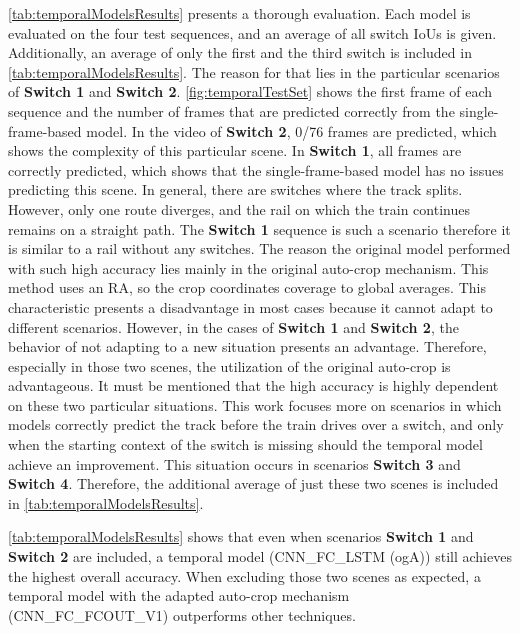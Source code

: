 \autoref{tab:temporalModelsResults} presents a thorough evaluation.
Each model is evaluated on the four test sequences, and an average of all switch \ac{IoU}s is given.
Additionally, an average of only the first and the third switch is included in \autoref{tab:temporalModelsResults}.
The reason for that lies in the particular scenarios of \textbf{Switch 1} and \textbf{Switch 2}.
\autoref{fig:temporalTestSet} shows the first frame of each sequence and the number of frames that are predicted correctly from the single-frame-based model.
In the video of \textbf{Switch 2}, 0/76 frames are predicted, which shows the complexity of this particular scene.
In \textbf{Switch 1}, all frames are correctly predicted, which shows that the single-frame-based model has no issues predicting this scene.
In general, there are switches where the track splits.
However, only one route diverges, and the rail on which the train continues remains on a straight path.
The \textbf{Switch 1} sequence is such a scenario therefore it is similar to a rail without any switches.
The reason the original model performed with such high accuracy lies mainly in the original auto-crop mechanism.
This method uses an \ac{RA}, so the crop coordinates coverage to global averages.
This characteristic presents a disadvantage in most cases because it cannot adapt to different scenarios.
However, in the cases of \textbf{Switch 1} and \textbf{Switch 2}, the behavior of not adapting to a new situation presents an advantage.
Therefore, especially in those two scenes, the utilization of the original auto-crop is advantageous.
It must be mentioned that the high accuracy is highly dependent on these two particular situations.
This work focuses more on scenarios in which models correctly predict the track before the train drives over a switch, and only when the starting context of the switch is missing should the temporal model achieve an improvement.
This situation occurs in scenarios \textbf{Switch 3} and \textbf{Switch 4}.
Therefore, the additional average of just these two scenes is included in \autoref{tab:temporalModelsResults}.

\autoref{tab:temporalModelsResults} shows that even when scenarios \textbf{Switch 1} and \textbf{Switch 2} are included, a temporal model (CNN\_FC\_LSTM (ogA)) still achieves the highest overall accuracy.
When excluding those two scenes as expected, a temporal model with the adapted auto-crop mechanism (CNN\_FC\_FCOUT\_V1) outperforms other techniques.

